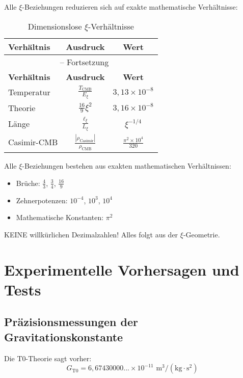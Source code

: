 \documentclass[12pt,a4paper]{article}
\begin{document}
	Alle $\xi$-Beziehungen reduzieren sich auf exakte mathematische Verhältnisse:
	
	\begin{longtable}{lcc}
		\caption{Dimensionslose $\xi$-Verhältnisse} \\
		\toprule
		\textbf{Verhältnis} & \textbf{Ausdruck} & \textbf{Wert} \\
		\midrule
		\endfirsthead
		\multicolumn{3}{c}{\tablename\ \thetable{} -- Fortsetzung} \\
		\toprule
		\textbf{Verhältnis} & \textbf{Ausdruck} & \textbf{Wert} \\
		\midrule
		\endhead
		Temperatur & $\frac{T_{\text{CMB}}}{E_\xi}$ & $3{,}13 \times 10^{-8}$ \\
		Theorie & $\frac{16}{9}\xi^2$ & $3{,}16 \times 10^{-8}$ \\
		Länge & $\frac{\ell_{\xi}}{L_\xi}$ & $\xi^{-1/4}$ \\
		Casimir-CMB & $\frac{|\rho_{\text{Casimir}}|}{\rho_{\text{CMB}}}$ & $\frac{\pi^2 \times 10^4}{320}$ \\
		\bottomrule
	\end{longtable}
	
	\begin{important}
		Alle $\xi$-Beziehungen bestehen aus exakten mathematischen Verhältnissen:
		\begin{itemize}
			\item Brüche: $\frac{4}{3}$, $\frac{3}{4}$, $\frac{16}{9}$
			\item Zehnerpotenzen: $10^{-4}$, $10^3$, $10^4$
			\item Mathematische Konstanten: $\pi^2$
		\end{itemize}
		KEINE willkürlichen Dezimalzahlen! Alles folgt aus der $\xi$-Geometrie.
	\end{important}
	
	\section{Experimentelle Vorhersagen und Tests}
	
	\subsection{Präzisionsmessungen der Gravitationskonstante}
	
	Die T0-Theorie sagt vorher:
	\begin{equation}
		G_{\text{T0}} = 6{,}67430000... \times 10^{-11} \text{ m}^3/(\text{kg} \cdot \text{s}^2)
	\end{equation}
	
\end{document}
